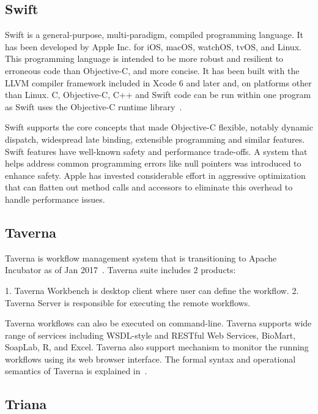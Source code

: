 \subsection{Swift}

Swift is a general-purpose, multi-paradigm, compiled programming
language. It has been developed by Apple Inc. for iOS, macOS, watchOS,
tvOS, and Linux. This programming language is intended to be more
robust and resilient to erroneous code than Objective-C, and more
concise. It has been built with the LLVM compiler framework included
in Xcode 6 and later and, on platforms other than Linux. C,
Objective-C, C++ and Swift code can be run within one program as Swift
uses the Objective-C runtime library~\cite{www-swift-wikipedia}.

   Swift supports the core concepts that made Objective-C flexible,
   notably dynamic dispatch, widespread late binding, extensible
   programming and similar features. Swift features have well-known
   safety and performance trade-offs. A system that helps address
   common programming errors like null pointers was introduced to
   enhance safety. Apple has invested considerable effort in
   aggressive optimization that can flatten out method calls and
   accessors to eliminate this overhead to handle performance issues.
      
\subsection{Taverna}

Taverna is workflow management system that is transitioning to Apache
Incubator as of Jan 2017~\cite{www-taverna}. Taverna suite includes 2
products:

   1. Taverna Workbench is desktop client where user can define the
      workflow.
   2. Taverna Server is responsible for executing the remote
      workflows.

      Taverna workflows can also be executed on command-line.  Taverna
      supports wide range of services including WSDL-style and RESTful
      Web Services, BioMart, SoapLab, R, and Excel. Taverna also
      support mechanism to monitor the running workflows using its web
      browser interface. The formal syntax and operational semantics
      of Taverna is explained in~\cite{taverna-paper}.

\pv

\subsection{Triana}

